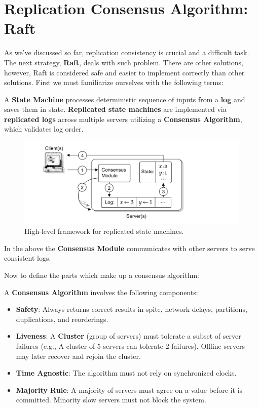 \section{Replication Consensus Algorithm: Raft}
As we've discussed so far, replication consistency is crucial and a 
difficult task. The next strategy, \textbf{Raft}, deals with such problem.
There are other solutions, however, Raft is considered safe and easier to 
implement correctly than other solutions. First we must familiarize ourselves with the following terms:
\begin{Def}
    
    A \textbf{State Machine} processes \underline{deterministic} sequence of inputs from a \textbf{log} and saves them
    in state.
    \textbf{Replicated state machines} are implemented via \textbf{replicated logs} across multiple servers
    utilizing a \textbf{Consensus Algorithm}, which validates log order.
\end{Def}

\vspace{-1em}
\begin{figure}[h]
    \centering
    \includegraphics[width=1\textwidth]{Sections/raft/state.png}
    \caption{High-level framework for replicated state machines.}
\end{figure}
\noindent
In the above the \textbf{Consensus Module} communicates with other servers to serve consistent logs. 

\newpage 

\noindent
Now to define the parts which make up a consensus algorithm:
\begin{Def}

    A \textbf{Consensus Algorithm} involves the following components:
    \begin{itemize}
        \item \textbf{Safety}: Always returns correct results in spite, network delays, partitions, duplications, and reorderings.
        \item \textbf{Liveness}: A \textbf{Cluster} (group of servers) must tolerate a subset of server failures (e.g., A cluster of 5 servers can tolerate 2 failures). Offline 
        servers may later recover and rejoin the cluster.
        \item \textbf{Time Agnostic}: The algorithm must not rely on synchronized clocks.
        \item \textbf{Majority Rule}: A majority of servers must agree on a value before it is committed. Minority slow servers must not block the system.
    \end{itemize}
\end{Def}

